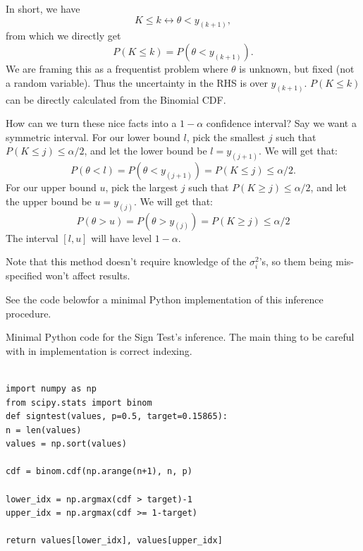 \documentclass[letterpaper,12pt]{article}
\begin{document}
In short, we have
\begin{equation*}K\leq k\leftrightarrow \theta< y_{(k+1)},\end{equation*}
from which we directly get
\begin{equation}\label{eq:st-prob}
  P(K\leq k)=P(\theta<y_{(k+1)}).
\end{equation}
We are framing this as a frequentist problem where $\theta$ is unknown, but fixed (not a random variable). Thus the uncertainty in the RHS is over $y_{(k+1)}$. $P(K\leq k)$ can be directly calculated from the Binomial CDF.

How can we turn these nice facts into a $1-\alpha$ confidence interval? Say we want a symmetric interval. For our lower bound $l$, pick the smallest $j$ such that $P(K\leq j)\leq \alpha/2$, and let the lower bound be $l=y_{(j+1)}$. We will get that:
\begin{equation*}P(\theta<l)=P(\theta<y_{(j+1)})=P(K\leq j)\leq \alpha/2 .\end{equation*}
For our upper bound $u$, pick the largest $j$ such that $P(K\geq j)\leq \alpha/2$, and let the upper bound be $u=y_{(j)}$. We
will get that:
\begin{equation*}P(\theta>u)=P(\theta>y_{(j)})=P(K\geq j)\leq \alpha/2\end{equation*}
The interval $[l,u]$ will have level $1-\alpha$.

Note that this method doesn't require knowledge of the $\sigma_i^2$'s, so them being mis-specified won't affect results.

See the code belowfor a minimal Python implementation of this inference procedure.

\begin{listing}[htbp]
\caption{Minimal Python code for the Sign Test's inference. The main thing to be careful with in implementation is correct indexing.}
\smaller
\begin{verbatim}

import numpy as np
from scipy.stats import binom
def signtest(values, p=0.5, target=0.15865):
n = len(values)
values = np.sort(values)

cdf = binom.cdf(np.arange(n+1), n, p)

lower_idx = np.argmax(cdf > target)-1
upper_idx = np.argmax(cdf >= 1-target)

return values[lower_idx], values[upper_idx]
\end{verbatim}
\end{listing}
\end{document}
